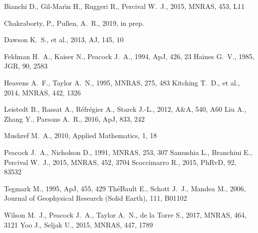 \documentclass[fleqn,usenatbib]{mnras}
\begin{document}
\begin{thebibliography}{99}
 Bianchi D., Gil-Mar{\'\i}n H., Ruggeri
R., Percival W.~J., 2015, MNRAS, 453, L11

Chakraborty, P., Pullen, A.~R., 2019, in prep.

Dawson K.~S., et al., 2013, AJ, 145, 10

 Feldman H.~A., Kaiser N., Peacock J.~A.,
1994, ApJ, 426, 23
 Haines
G.~V., 1985, JGR, 90, 2583

Heavens A.~F., Taylor A.~N., 1995, MNRAS, 275, 483
Kitching T.~D., et al., 2014, MNRAS, 442, 1326

 Leistedt B., Rassat A., R{\'e}fr{\'e}gier
A., Starck J.-L., 2012, A\&A, 540, A60
 Liu A., Zhang Y., Parsons A.~R., 2016,
ApJ, 833, 242

 Mushref M.~A., 2010, Applied
Mathematics, 1, 18

 Peacock J.~A., Nicholson D., 1991,
MNRAS, 253, 307
 Samushia L., Branchini E., Percival
W.~J., 2015, MNRAS, 452, 3704
Scoccimarro R., 2015, PhRvD, 92, 83532

 Tegmark
M., 1995, ApJ, 455, 429
 Th{\'e}Bault E., Schott J.~J., Mandea M.,
2006, Journal of Geophysical Research (Solid Earth), 111, B01102

 Wilson M.~J., Peacock J.~A., Taylor A.~N.,
de la Torre S., 2017, MNRAS, 464, 3121
 Yoo
J., Seljak U., 2015, MNRAS, 447, 1789

\end{thebibliography}




\appendix



\bsp	%
\label{lastpage}
\end{document}

